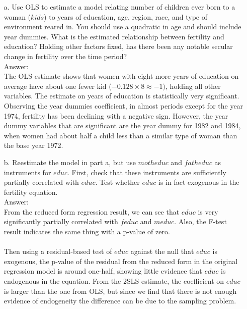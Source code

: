 \documentclass[10pt]{article}
\begin{document}
\begin{enumerate}
\item[a.] Use OLS to estimate a model relating number of children ever born to a woman ($kids$) to years of education, age, region, race, and type of environment reared in. You should use a quadratic in age and should include year dummies. What is the estimated relationship between fertility and education? Holding other factors fixed, has there been any notable secular change in fertility over the time period?
\\ Answer: \\

The OLS estimate shows that women with eight more years of education on average have about one fewer kid ($-0.128\times8\approx -1)$, holding all other variables. The estimate on years of education is statistically very significant. Observing the year dummies coefficient, in almost periods except for the year 1974, fertility has been declining with a negative sign. However, the year dummy variables that are significant are the year dummy for 1982 and 1984, when women had about half a child less than a similar type of woman than the base year 1972.

\item[b.] Reestimate the model in part a, but use $motheduc$ and $fatheduc$ as instruments for $educ$. First, check that these instruments are sufficiently partially correlated with $educ$. Test whether $educ$ is in fact exogenous in the fertility equation.
\\ Answer: \\
From the reduced form regression result, we can see that $educ$ is very significantly partially correlated with $feduc$ and $meduc$. Also, the F-test result indicates the same thing with a p-value of zero.\\ \\

Then using a residual-based test of $educ$ against the null that $educ$ is exogenous, the p-value of the residual from the reduced form in the original regression model is around one-half, showing little evidence that $educ$ is endogenous in the equation. From the 2SLS estimate, the coefficient on $educ$ is larger than the one from OLS, but since we find that there is not enough evidence of endogeneity the difference can be due to the sampling problem.  


\end{enumerate}
\end{document}
